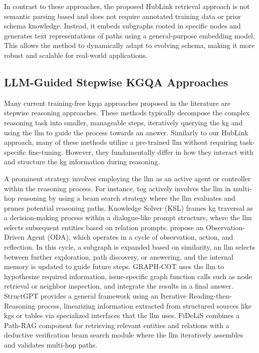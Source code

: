 In contrast to these approaches, the proposed HubLink retrieval approach is not semantic parsing based and does not require annotated training data or prior schema knowledge. Instead, it embeds subgraphs rooted in specific nodes and generates text representations of paths using a general-purpose embedding model. This allows the method to dynamically adapt to evolving schema, making it more robust and scalable for real-world applications.

\subsection{LLM-Guided Stepwise KGQA Approaches}
\label{sec:related_work_stepwise_kgqa}

Many current training-free \gls{kgqa} approaches proposed in the literature are stepwise reasoning approaches. These methods typically decompose the complex reasoning task into smaller, manageable steps, iteratively querying the \gls{kg} and using the \gls{llm} to guide the process towards an answer. Similarly to our HubLink approach, many of these methods utilize a pre-trained \gls{llm} without requiring task-specific fine-tuning. However, they fundamentally differ in how they interact with and structure the \gls{kg} information during reasoning.

A prominent strategy involves employing the \gls{llm} as an active agent or controller within the reasoning process. For instance, \gls{tog} \cite{sun_think--graph_2024} actively involves the \gls{llm} in multi-hop reasoning by using a beam search strategy where the \gls{llm} evaluates and prunes potential reasoning paths. Knowledge Solver (KSL) \cite{feng_knowledge_2023} frames \gls{kg} traversal as a decision-making process within a dialogue-like prompt structure, where the \gls{llm} selects subsequent entities based on relation prompts. \textcite{sun_oda_2024} propose an Observation-Driven Agent (ODA), which operates in a cycle of observation, action, and reflection. In this cycle, a subgraph is expanded based on similarity, an \gls{llm} selects between further exploration, path discovery, or answering, and the internal memory is updated to guide future steps. GRAPH-COT \cite{jin_graph_2024} uses the \gls{llm} to hypothesize required information, issue-specific graph function calls such as node retrieval or neighbor inspection, and integrate the results in a final answer. StructGPT \cite{jiang_structgpt_2023} provides a general framework using an Iterative Reading-then-Reasoning process, linearizing information extracted from structured sources like \glspl{kg} or tables via specialized interfaces that the \gls{llm} uses. FiDeLiS \cite{sui_fidelis_2024} combines a Path-RAG component for retrieving relevant entities and relations with a deductive verification beam search module where the \gls{llm} iteratively assembles and validates multi-hop paths.

